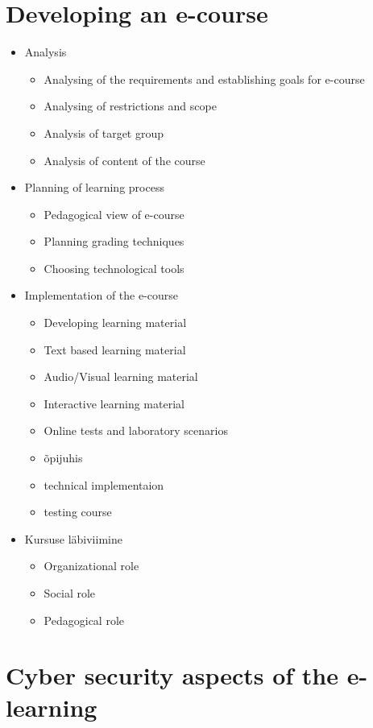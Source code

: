 \section{Developing an e-course}
\begin{itemize}
	\item Analysis
	\begin{itemize}
		\item Analysing of the requirements and establishing goals for e-course
		\item Analysing of restrictions and scope
		\item Analysis of target group
		\item Analysis of content of the course
	\end{itemize}
	\item Planning of learning process
	\begin{itemize}
		\item Pedagogical view of e-course
		\item Planning grading techniques
		\item Choosing technological tools
	\end{itemize}
	\item Implementation of the e-course
	\begin{itemize}
		\item Developing learning material
		\item Text based learning material
		\item Audio/Visual learning material
		\item Interactive learning material
		\item Online tests and laboratory scenarios 
		\item õpijuhis 
		\item technical implementaion
		\item testing course
	\end{itemize}
	\item Kursuse läbiviimine
	\begin{itemize}
		\item Organizational role
		\item Social role
		\item Pedagogical role
	\end{itemize}
\end{itemize}

\section{Cyber security aspects of the e-learning}
